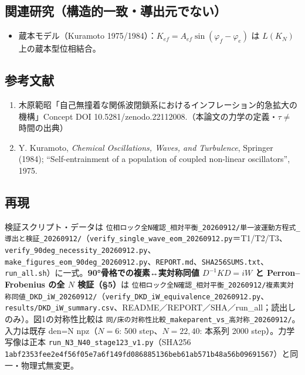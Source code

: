 \documentclass[
  a4paper,
]{ltjsarticle}
\providecommand{\tightlist}{%
  \setlength{\itemsep}{0pt}\setlength{\parskip}{0pt}}
\begin{document}
\subsection{関連研究（構造的一致・導出元でない）}\label{ux95a2ux9023ux7814ux7a76ux69cbux9020ux7684ux4e00ux81f4ux5c0eux51faux5143ux3067ux306aux3044}

\begin{itemize}
\tightlist
\item
  蔵本モデル（Kuramoto
  1975/1984）：\(K_{ef}=A_{ef}\sin(\varphi_f-\varphi_e)\) は \(L(K_N)\)
  上の蔵本型位相結合。
\end{itemize}

\subsection{参考文献}\label{ux53c2ux8003ux6587ux732e}

\begin{enumerate}
\def\labelenumi{\arabic{enumi}.}
\tightlist
\item
  木原範昭「自己無撞着な関係波閉鎖系におけるインフレーション的急拡大の機構」Concept
  DOI 10.5281/zenodo.22112008.（本論文の力学の定義・\(\tau\neq\)
  時間の出典）
\item
  Y. Kuramoto, \emph{Chemical Oscillations, Waves, and Turbulence},
  Springer (1984); ``Self-entrainment of a population of coupled
  non-linear oscillators'', 1975.
\end{enumerate}

\subsection{再現}\label{ux518dux73fe}

検証スクリプト・データは
\texttt{位相ロック全N確認\_相対平衡\_20260912/単一波運動方程式\_導出と検証\_20260912/}（\texttt{verify\_single\_wave\_eom\_20260912.py}＝T1/T2/T3、\texttt{verify\_90deg\_necessity\_20260912.py}、\texttt{make\_figures\_eom\_90deg\_20260912.py}、\texttt{REPORT.md}、\texttt{SHA256SUMS.txt}、\texttt{run\_all.sh}）に一式。\textbf{90°骨格での複素↔実対称同値
\(D^{-1}KD=iW\) と Perron--Frobenius の全 \(N\) 検証（§5）}は
\texttt{位相ロック全N確認\_相対平衡\_20260912/複素実対称同値\_DKD\_iW\_20260912/}（\texttt{verify\_DKD\_iW\_equivalence\_20260912.py}、\texttt{results/DKD\_iW\_summary.csv}、README／REPORT／SHA／run\_all；読出しのみ）。図1の対称性比較は
\texttt{同/床の対称性比較\_makeparent\_vs\_高対称\_20260912/}。入力は既存
den=N npz（\(N=6\): 500 step、\(N=22,40\): 本系列 2000
step）。力学写像は正本 \texttt{run\_N3\_N40\_stage123\_v1.py}（SHA256
\texttt{1abf2353fee2e4f56f05e7a6f149fd086885136beb61ab571b48a56b09691567}）と同一・物理式無変更。
\end{document}

